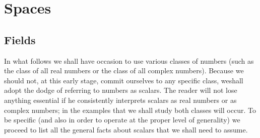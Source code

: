 \chapter{Spaces}

\section{Fields}

In what follows we shall have occasion to use various classes of numbers (such
as the class of all real numbers or the class of all complex numbers). Because
we should not, at this early stage, commit ourselves to any specific class,
weshall adopt the dodge of referring to numbers as scalars. The reader will not
lose anything essential if he consistently interprets scalars as real numbers or
as complex numbers; in the examples that we shall study both classes will occur.
To be specific (and also in order to operate at the proper level of generality)
we proceed to list all the general facts about scalars that we shall need to
assume.
